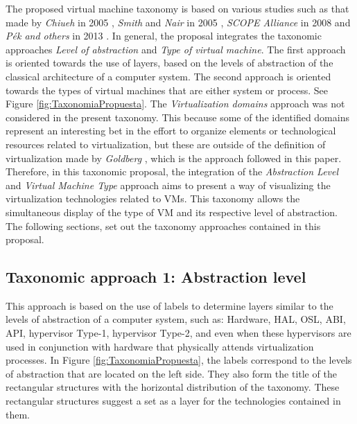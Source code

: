 	
	
	
	The proposed virtual machine taxonomy is based on various studies such as that made by \textit{Chiueh} in 2005 \cite{Chiueh2005}, \textit{Smith} and \textit{Nair} in 2005 \cite{Smith2005}, \textit{SCOPE Alliance} in 2008 \cite{SCOPEAlliance2008} and \textit{P{\'e}k and others} in 2013 \cite{Pek2013}. In general, the proposal integrates the taxonomic approaches \textit{Level of abstraction} and \textit{Type of virtual machine}. The first approach is oriented towards the use of layers, based on the levels of abstraction of the classical architecture of a computer system. The second approach is oriented towards the types of virtual machines that are either system or process. See Figure \ref{fig:TaxonomiaPropuesta}. The \textit{Virtualization domains} approach was not considered in the present taxonomy.  This because some of the identified domains represent an interesting bet in the effort to organize elements or technological resources related to virtualization, but these are outside of the definition of virtualization made by \textit{Goldberg} \cite{Goldberg1973}, which is the approach followed in this paper. Therefore, in this taxonomic proposal, the integration of the \textit{Abstraction Level} and \textit{Virtual Machine Type} approach aims to present a way of visualizing the virtualization technologies related to VMs. This taxonomy allows the simultaneous display of the type of VM and its respective level of abstraction. The following sections, set out the taxonomy approaches contained in this proposal.
	
	\subsection{Taxonomic approach 1: Abstraction level}

	This approach is based on the use of labels to determine layers similar to the levels of abstraction of a computer system, such as: Hardware, HAL, OSL, ABI, API, hypervisor Type-1, hypervisor Type-2, and even when these hypervisors are used in conjunction with hardware that physically attends virtualization processes. In Figure \ref{fig:TaxonomiaPropuesta}, the labels correspond to the levels of abstraction that are located on the left side. They also form the title of the rectangular structures with the horizontal distribution of the taxonomy. These rectangular structures suggest a set as a layer for the technologies contained in them.
	
